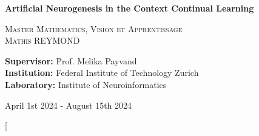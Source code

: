 \documentclass[11pt]{article}
\begin{document}
\begin{titlepage}
    
    
    \vspace{0cm}
    
    
    \vfill
    
    {\huge \bfseries Artificial Neurogenesis in the Context Continual Learning \\[0.4cm]} %
    
    \textsc{\LARGE Master Mathematics, Vision et Apprentissage}\\[1.5cm] %
    
    \textsc{\Large Mathis REYMOND}\\[0.5cm] %
    
    \vfill
    
    \Large
    \begin{tabbing}
        \hspace{4cm} \= \textbf{Supervisor:} \hspace{1cm} \= Prof. Melika Payvand \\ %
        \hspace{4cm} \= \textbf{Institution:} \> Federal Institute of Technology Zurich \\ %
        \hspace{4cm} \= \textbf{Laboratory:} \> Institute of Neuroinformatics \\ %
    \end{tabbing}
    
    \vfill
    
    {\large April 1st 2024 - August 15th 2024}\\[2cm] %
    
\end{titlepage}



\twocolumn[
\end{document}
